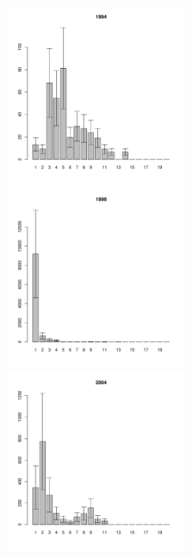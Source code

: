 \documentclass[12pt, a4paper]{article}
\begin{document}
\begin{figure}[h]
\begin{multicols}{3}
\hfill
\includegraphics[width=60mm]{../White_Sea/Luvenga_II_razrez/high_beatch_1994_.pdf}
\hfill
\includegraphics[width=60mm]{../White_Sea/Luvenga_II_razrez/high_beatch_1998_.pdf}
\hfill
\includegraphics[width=60mm]{../White_Sea/Luvenga_II_razrez/high_beatch_2004_.pdf}
\end{multicols}



\end{figure}
\end{document}
